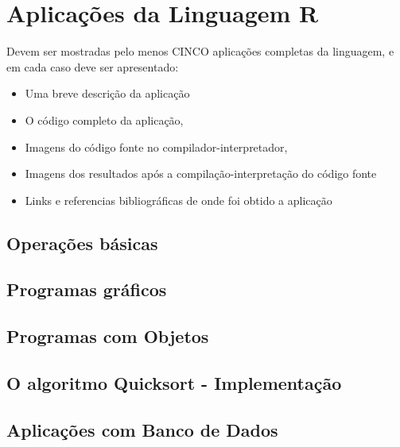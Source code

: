 %


\chapter{ Aplica\c{c}\~{o}es da Linguagem R}

Devem ser mostradas pelo menos CINCO aplica\c{c}\~{o}es completas da linguagem, e em cada caso deve ser apresentado:
\begin{itemize}
  \item Uma breve descri\c{c}\~{a}o da aplica\c{c}\~{a}o
  \item O c\'{o}digo completo da aplica\c{c}\~{a}o,
  \item Imagens do c\'{o}digo fonte no compilador-interpretador,
  \item Imagens dos resultados ap\'{o}s a compila\c{c}\~{a}o-interpreta\c{c}\~{a}o do c\'{o}digo fonte
  \item Links e referencias bibliogr\'{a}ficas de onde foi obtido a aplica\c{c}\~{a}o
\end{itemize}




    \section{Opera\c{c}\~{o}es b\'{a}sicas}


    \section{Programas gr\'{a}ficos}


    \section{Programas com Objetos}


    \section{O algoritmo Quicksort - Implementa\c{c}\~{a}o}


    \section{Aplica\c{c}\~{o}es com Banco de Dados}

